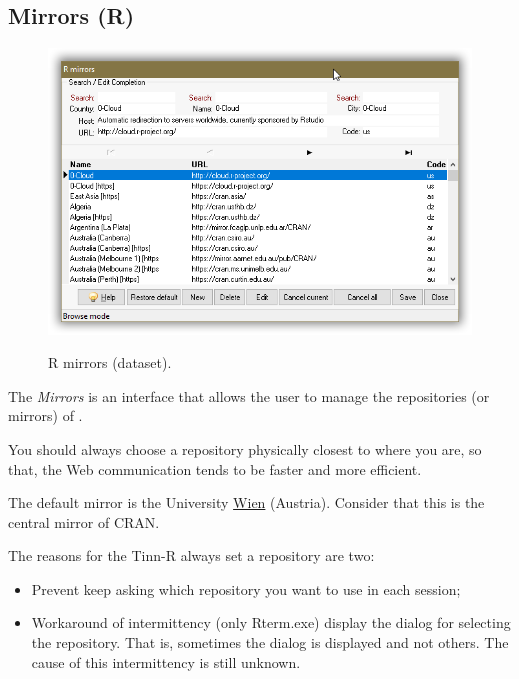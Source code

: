 \hypertarget{dlg_mirrors}{}
\subsection{Mirrors (R)}

\begin{figure}[H]
  \includegraphics[scale=0.8]{./res/dlg_mirrors.png}\\
  \caption{R mirrors (dataset).}
  \label{fig:dlg_mirrors}
\end{figure}
The \textit{Mirrors} is an interface that allows the user to manage the
repositories (or mirrors) of \RR{}.

You should always choose a repository physically closest to where you are,
so that, the Web communication tends to be faster and more efficient.

The default mirror is the University \href{http://cran.at.r-project.org/}{Wien}
(Austria). Consider that this is the central mirror of CRAN.

The reasons for the Tinn-R always set a repository are two:
\begin {itemize}
   \item Prevent \RR{} keep asking which repository you want to use in each session;
   \item Workaround of intermittency (only Rterm.exe) display the dialog for selecting the repository.
    That is, sometimes the dialog is displayed and not others.
    The cause of this intermittency is still unknown.
\end {itemize}

